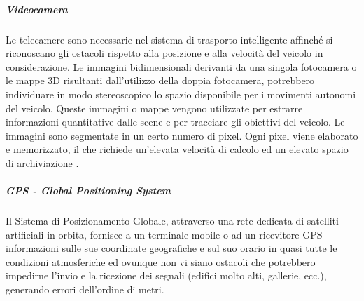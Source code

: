 \documentclass[14pt]{extarticle}
\begin{document}
\subparagraph{Videocamera}
Le telecamere sono necessarie nel sistema di trasporto intelligente affinché si riconoscano gli ostacoli rispetto alla posizione e alla velocità del
veicolo in considerazione. Le immagini bidimensionali derivanti da una
singola fotocamera o le mappe 3D risultanti dall'utilizzo della doppia
fotocamera, potrebbero individuare in modo stereoscopico lo spazio disponibile per i movimenti autonomi del veicolo. Queste immagini o mappe
vengono utilizzate per estrarre informazioni quantitative dalle scene e
per tracciare gli obiettivi del veicolo. Le immagini sono segmentate in un
certo numero di pixel. Ogni pixel viene elaborato e memorizzato, il che richiede un'elevata velocità di calcolo ed un elevato spazio di archiviazione
\cite{das2018risk}.

\subparagraph{GPS - Global Positioning System}
Il Sistema di Posizionamento Globale, attraverso una rete dedicata di satelliti artificiali in orbita, fornisce a un terminale mobile o ad un ricevitore
GPS informazioni sulle sue coordinate geografiche e sul suo orario in
quasi tutte le condizioni atmosferiche ed ovunque non vi siano ostacoli
che potrebbero impedirne l'invio e la ricezione dei segnali (edifici molto
alti, gallerie, ecc.), generando errori dell'ordine di metri.

	
\end{document}
